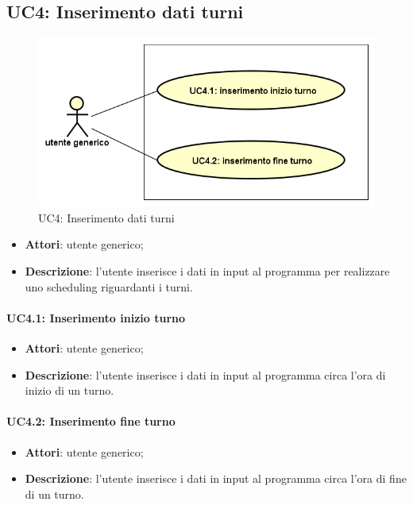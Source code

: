 \subsection{UC4: Inserimento dati turni}
\label{UC4}
\begin{figure}[!h]
    \def\svgwidth{\columnwidth}
    \includegraphics[width=\textwidth]{../immagini/usecase/UC4.png}
    \caption{UC4: Inserimento dati turni}
\end{figure}
\FloatBarrier
\noindent
\begin{itemize}
    \item \textbf{Attori}: utente generico;
    \item \textbf{Descrizione}: l'utente inserisce i dati in input al programma per realizzare uno scheduling riguardanti i turni.
\end{itemize}
\paragraph{UC4.1: Inserimento inizio turno}
\begin{itemize}
\item \textbf{Attori}: utente generico;
\item \textbf{Descrizione}: l'utente inserisce i dati in input al programma circa l'ora di inizio di un turno.
\end{itemize}
\paragraph{UC4.2: Inserimento fine turno}
\begin{itemize}
\item \textbf{Attori}: utente generico;
\item \textbf{Descrizione}: l'utente inserisce i dati in input al programma circa l'ora di fine di un turno.
\end{itemize}

